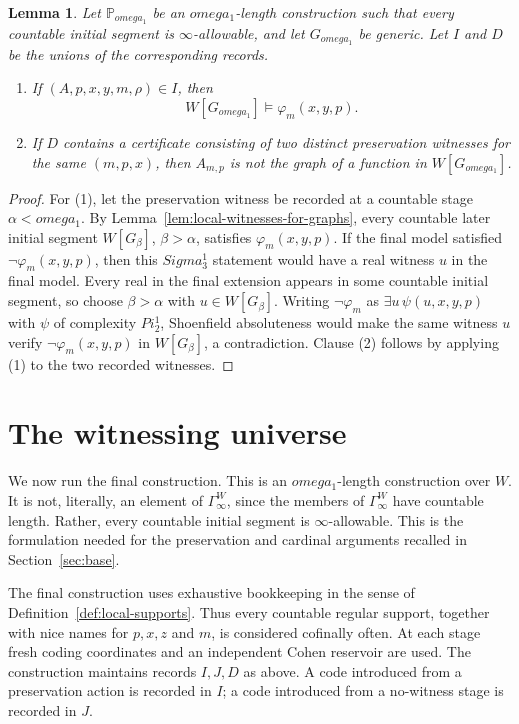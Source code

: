 \documentclass{article}
\newtheorem{lemma}[theorem]{Lemma}
\theoremstyle{remark}
\theoremstyle{plain}
\newcommand{\forceP}{\mathbb{P}}
\def\Pi{Pi}%
\def\Sigma{Sigma}%
\def\omega{omega}%
\begin{document}
\begin{lemma}\label{lem:final-persistence}
Let $\forceP_{\omega_1}$ be an $\omega_1$-length construction such that every
countable initial segment is $\infty$-allowable, and let $G_{\omega_1}$ be
generic. Let $I$ and $D$ be the unions of the corresponding records.
\begin{enumerate}[label=\textup{(\arabic*)}]
\item If $(A,p,x,y,m,\rho)\in I$, then
\[
   W[G_{\omega_1}]\models\varphi_m(x,y,p).
\]
\item If $D$ contains a certificate consisting of two distinct preservation
witnesses for the same $(m,p,x)$, then $A_{m,p}$ is not the graph of a function in
$W[G_{\omega_1}]$.
\end{enumerate}
\end{lemma}

\begin{proof}
For (1), let the preservation witness be recorded at a countable stage
$\alpha<\omega_1$. By Lemma~\ref{lem:local-witnesses-for-graphs}, every
countable later initial segment $W[G_\beta]$, $\beta>\alpha$, satisfies
$\varphi_m(x,y,p)$. If the final model satisfied
$\neg\varphi_m(x,y,p)$, then this $\Sigma^1_3$ statement would have a real witness
$u$ in the final model. Every real in the final extension appears in some
countable initial segment, so choose $\beta>\alpha$ with
$u\in W[G_\beta]$. Writing $\neg\varphi_m$ as $\exists u\,\psi(u,x,y,p)$ with
$\psi$ of complexity $\Pi^1_2$, Shoenfield absoluteness would make the same
witness $u$ verify $\neg\varphi_m(x,y,p)$ in $W[G_\beta]$, a contradiction.
Clause (2) follows by applying (1) to the two recorded witnesses.
\end{proof}

\section{The witnessing universe}\label{sec:witness}

We now run the final construction. This is an $\omega_1$-length construction
over $W$. It is not, literally, an element of $\Gamma^W_\infty$, since the
members of $\Gamma^W_\infty$ have countable length. Rather, every countable
initial segment is $\infty$-allowable. This is the formulation needed for the
preservation and cardinal arguments recalled in Section~\ref{sec:base}.

The final construction uses exhaustive bookkeeping in the sense of
Definition~\ref{def:local-supports}. Thus every countable regular support,
together with nice names for $p,x,z$ and $m$, is considered cofinally often. At
each stage fresh coding coordinates and an independent Cohen reservoir are used.
The construction maintains records $I,J,D$ as above. A code introduced from a
preservation action is recorded in $I$; a code introduced from a no-witness stage
is recorded in $J$.
\end{document}
